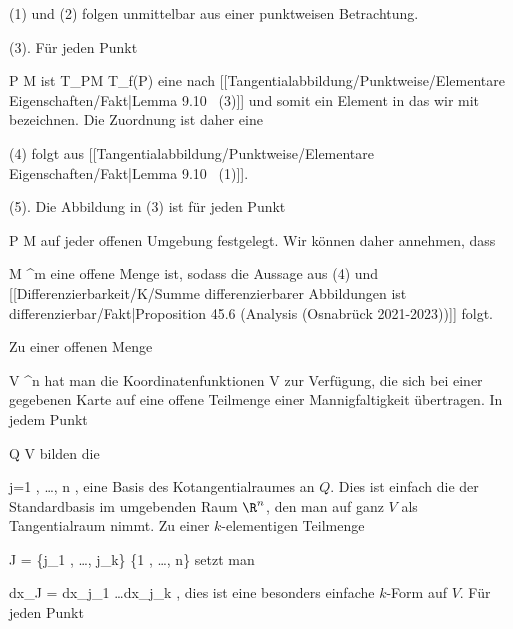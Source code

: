 {

\teilbeweis {}{}{}
{(1) und (2) folgen unmittelbar aus einer punktweisen Betrachtung.}
{} \teilbeweis {}{}{}
{(3). Für jeden Punkt

\mavergleichskette
{\vergleichskette
{ P
}
{ \in }{ M
}
{  }{
}
{    }{
}
{   }{
}
}
{}{}{}
ist
 { T_PM } { T_{f(P)} \R \cong \R
} {}
eine nach
[[Tangentialabbildung/Punktweise/Elementare Eigenschaften/Fakt|Lemma 9.10  (3)]]
und somit ein Element in
 das wir mit
 bezeichnen. Die Zuordnung
 ist daher eine
}
{}
\teilbeweis {}{}{}
{(4) folgt aus
[[Tangentialabbildung/Punktweise/Elementare Eigenschaften/Fakt|Lemma 9.10  (1)]].}
{}
\teilbeweis {}{}{}
{(5). Die Abbildung in (3) ist für jeden Punkt

\mavergleichskette
{\vergleichskette
{ P
}
{ \in }{ M
}
{  }{
}
{    }{
}
{   }{
}
}
{}{}{}
auf jeder offenen Umgebung festgelegt. Wir können daher annehmen, dass

\mavergleichskette
{\vergleichskette
{ M
}
{ \subseteq }{ \R^m
}
{  }{
}
{    }{
}
{   }{
}
}
{}{}{}
eine offene Menge ist, sodass die Aussage aus (4) und
[[Differenzierbarkeit/K/Summe differenzierbarer Abbildungen ist differenzierbar/Fakt|Proposition 45.6 (Analysis (Osnabrück 2021-2023))]]
folgt.}
{}

}

Zu einer offenen Menge

\mavergleichskette
{\vergleichskette
{ V
}
{ \subseteq }{ \R^n
}
{  }{
}
{    }{
}
{   }{
}
}
{}{}{}
hat man die Koordinatenfunktionen
 {V} {\R
} {}
zur Verfügung, die sich bei einer gegebenen Karte auf eine offene Teilmenge einer Mannigfaltigkeit übertragen. In jedem Punkt

\mavergleichskette
{\vergleichskette
{ Q
}
{ \in }{ V
}
{  }{
}
{    }{
}
{   }{
}
}
{}{}{}
bilden die

 {}
 {j=1 , \ldots , n} {}
 {} {} {} {,}
eine Basis des Kotangentialraumes an $Q$. Dies ist einfach die
der Standardbasis im umgebenden Raum $\R^n$, den man auf ganz $V$ als Tangentialraum nimmt. Zu einer $k$-elementigen Teilmenge

\mavergleichskettedisp
{\vergleichskette
{ J
}
{ =} { \{j_1 , \ldots , j_k\}
}
{ \subseteq} { \{1 , \ldots , n\}
}
{ } {
}
{ } {
}
}
{}{}{}
setzt man

\mavergleichskettedisp
{\vergleichskette
{  dx_J
}
{ =} {  dx_{j_1} \wedge \ldots \wedge dx_{j_k}
}
{ } {
}
{ } {
}
{ } {
}
}
{}{}{,}
dies ist eine besonders einfache $k$-Form auf $V$. Für jeden Punkt

